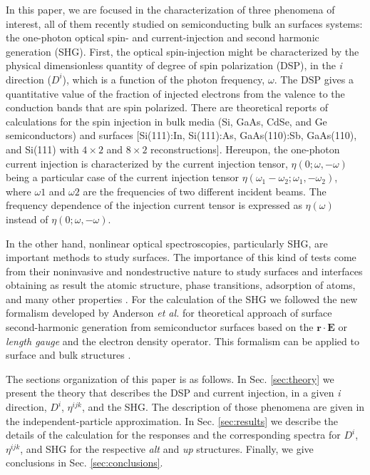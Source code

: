 \documentclass[aps,pra,11pt,tightenlines,showpacs,superscriptaddress,groupedaddress]{revtex4-1}
\begin{document}
In this paper, we are focused in the characterization of three phenomena of interest, all of them recently studied on semiconducting bulk an surfaces systems: the one-photon optical spin- and current-injection and  second harmonic generation (SHG). First, the optical spin-injection might be characterized by the physical dimensionless quantity of degree of spin polarization (DSP), in the \emph{i} direction ($D^{i}$), which is a function of the photon frequency, $\omega$. The DSP gives a quantitative value of the fraction of injected electrons from the valence to the conduction bands that are spin polarized. There are theoretical reports of calculations for the spin injection in bulk media  (Si, GaAs, CdSe, and Ge semiconductors) \cite{nastos2007full,cabellos2009stress,rioux2010optical} and surfaces  [Si(111):In, Si(111):As, GaAs(110):Sb, GaAs(110), and Si(111) with $4\times2$ and $8\times2$ reconstructions]\cite{mendoza2012optical,arzate2014optical}. Hereupon, the one-photon current injection is characterized by the current injection tensor, $\eta(0;\omega,-\omega)$  being a particular case of the current injection tensor $\eta(\omega_{1}-\omega_{2};\omega_{1},-\omega_{2})$, where $\omega{1}$ and $\omega{2}$ are the frequencies of two different incident beams. The frequency dependence of the injection current tensor is expressed as $\eta(\omega)$ instead of $\eta(0;\omega,-\omega)$.

In the other hand, nonlinear optical spectroscopies, particularly SHG, are important methods to study surfaces. The importance of this kind of tests come from their noninvasive and nondestructive nature to study surfaces and interfaces obtaining as result the atomic structure, phase transitions, adsorption of atoms, and many other properties \cite{dadap1997second,daum1993identification,mcgilp1994probing,power1995resonant,godefroy1996electric,salazar2014molecular,chen1981surface,mendoza1998microscopic}. For the calculation of the SHG we followed the new formalism developed by Anderson \emph{et al.} for theoretical approach of surface second-harmonic generation from semiconductor surfaces \cite{anderson2015theory} based on the $\mathbf{r}\cdot\mathbf{E} $ or \textit{length gauge} and the electron density operator. This formalism can be applied to surface and bulk structures \cite{anderson2015theory,sipe2000second}.

The sections organization of this paper is as follows. In Sec. \ref{sec:theory} we present the theory that describes the DSP and current injection, in a given \emph{i} direction, $D^{i}$, $\eta^{ijk}$, and the SHG. The description of those phenomena are given in the independent-particle approximation. In Sec. \ref{sec:results} we describe the details of the calculation for the responses and the corresponding spectra for  $D^{i}$, $\eta^{ijk}$, and SHG for the respective \emph{alt} and \emph{up} structures. Finally, we give conclusions in Sec. \ref{sec:conclusions}.
\end{document}
